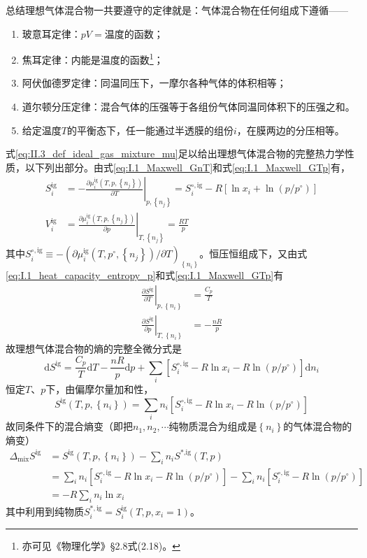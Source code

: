 \documentclass[main.tex]{subfiles}
\begin{document}
总结理想气体混合物一共要遵守的定律就是：气体混合物在任何组成下遵循——
\begin{enumerate}
    \item 玻意耳定律：$pV=\text{温度的函数}$；
    \item 焦耳定律：内能是温度的函数\footnote{亦可见《物理化学》\S 2.8式(2.18)。}；
    \item 阿伏伽德罗定律：同温同压下，一摩尔各种气体的体积相等；
    \item 道尔顿分压定律：混合气体的压强等于各组份气体同温同体积下的压强之和。
    \item 给定温度$T$的平衡态下，任一能通过半透膜的组份$i$，在膜两边的分压相等。
\end{enumerate}

式\eqref{eq:II.3_def_ideal_gas_mixture_mu}足以给出理想气体混合物的完整热力学性质，以下列出部分。由式\eqref{eq:I.1_Maxwell_GnT}和式\eqref{eq:I.1_Maxwell_GTp}有，
\begin{align}
    S^\text{ig}_i & =-\left.\frac{\partial \mu^\text{ig}_i\left(T,p,\left\{n_j\right\}\right)}{\partial T}\right|_{p,\left\{n_j\right\}}=S_i^{\circ,\text{ig}}-R\left[\ln x_i+\ln \left(p/p^\circ\right)\right] \\
    V^\text{ig}_i & =\left.\frac{\partial\mu^\text{ig}_i\left(T,p,\left\{n_j\right\}\right)}{\partial p}\right|_{T,\left\{n_j\right\}}=\frac{RT}{p}
\end{align}
其中$S_i^{\circ,\text{ig}}\equiv-\left(\partial\mu_i^\text{ig}\left(T,p^\circ,\left\{n_j\right\}\right)/\partial T\right)_{\left\{n_i\right\}}$。恒压恒组成下，又由式\eqref{eq:I.1_heat_capacity_entropy_p}和式\eqref{eq:I.1_Maxwell_GTp}有
\begin{align}
    \left.\frac{\partial S^\text{ig}}{\partial T}\right|_{p,\left\{n_i\right\}} & =\frac{C_p}{T} \\
    \left.\frac{\partial S^\text{ig}}{\partial p}\right|_{T,\left\{n_i\right\}} & =-\frac{nR}{p}
\end{align}
故理想气体混合物的熵的完整全微分式是
\[\mathrm{d}S^\text{ig}=\frac{C_p}{T}\mathrm{d}T-\frac{nR}{p}\mathrm{d}p+\sum_i\left[S_i^{\circ,\text{ig}}-R\ln x_i-R\ln\left(p/p^\circ\right)\right]\mathrm{d}n_i\]
恒定$T$、$p$下，由偏摩尔量加和性，
\[S^\text{ig}\left(T,p,\left\{n_i\right\}\right)=\sum_in_i\left[S_i^{\circ,\text{ig}}-R\ln x_i-R\ln\left(p/ p^\circ\right)\right]\]
故同条件下的混合熵变（即把$n_1,n_2,\cdots$纯物质混合为组成是$\left\{n_i\right\}$的气体混合物的熵变）
\begin{align*}
    \Delta_\text{mix}S^\text{ig} & =S^\text{ig}\left(T,p,\left\{n_i\right\}\right)-\sum_i n_i S^\text{*,ig}\left(T,p\right)                                                                \\
                                 & =\sum_in_i\left[S_i^{\circ,\text{ig}}-R\ln x_i-R\ln\left(p/p^\circ\right)\right]-\sum_in_i\left[S_i^{\circ,\text{ig}}-R\ln\left(p/p^\circ\right)\right] \\
                                 & =-R\sum_in_i\ln x_i
\end{align*}
其中利用到纯物质$S_i^{*,\text{ig}}=S_i^\text{ig}\left(T,p,x_i=1\right)$。
\end{document}
